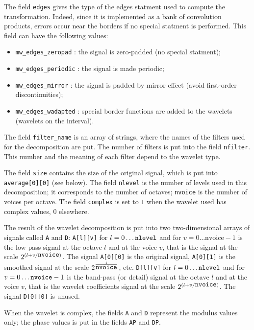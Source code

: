 The field \verb+edges+ gives the type of the edges statment used to compute
the transformation. Indeed, since it is implemented as a bank of convolution
products, errors occur near the borders if no special statment is performed.
This field can have the following values:
\begin{itemize}
\item \verb+mw_edges_zeropad+ : the signal is zero-padded (no special statment);
\item \verb+mw_edges_periodic+ : the signal is made periodic;
\item \verb+mw_edges_mirror+ : the signal is padded by mirror effect (avoid first-order discontinuities);
\item \verb+mw_edges_wadapted+ : special border functions are added to the wavelets (wavelets on the interval).
\end{itemize}

The field \verb+filter_name+ is an array of strings, where the names of the filters used for the decomposition are put. 
The number of filters is put into the field \verb+nfilter+.
This number and the meaning of each filter depend to the wavelet type.

The field \verb+size+ contains the size of the original signal, which is put
into \verb+average[0][0]+ (see below).
The field \verb+nlevel+ is the number of levels used in this decomposition; it corresponds to the number of octaves; \verb+nvoice+ is the number of voices per octave.
The field \verb+complex+ is set to $1$ when the wavelet used has complex values, $0$ elsewhere.

The result of the wavelet decomposition is put into two two-dimensional arrays of signals called \verb+A+ and \verb+D+:
\verb+A[l][v]+ for $l=0 \ldots \mbox{{\tt nlevel}}$ and for
$v=0 \ldots \mbox{nvoice}-1$ is the low-pass signal at the octave $l$ and at the voice $v$, that is the signal at the scale $2^{(l+v/\mbox{{\tt nvoice}})}$.
The signal \verb+A[0][0]+ is the original signal, \verb+A[0][1]+ is the
smoothed signal at the scale  $2^{\frac{1}{\mbox{{\tt nvoice}}}}$, etc.
\verb+D[l][v]+ for $l=0 \ldots \mbox{{\tt nlevel}}$ and for
$v=0 \ldots \mbox{{\tt nvoice}}-1$ is the band-pass (or detail) signal at the octave $l$ and at the voice $v$, that is the wavelet coefficients signal at the scale $2^{(l+v/\mbox{{\tt nvoice}})}$.
The signal \verb+D[0][0]+ is unused.

When the wavelet is complex, the fields \verb+A+ and \verb+D+ represent the
modulus values only; the phase values is put in the fields \verb+AP+ and
\verb+DP+.

